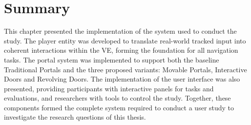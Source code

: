 \section{Summary}
\label{sec:summary}

This chapter presented the implementation of the system used to conduct the study. The player entity was developed to translate real-world tracked input
into coherent interactions within the \gls{VE}, forming the foundation for all navigation tasks. The portal system was implemented to support both the 
baseline Traditional Portals and the three proposed variants: Movable Portals, Interactive Doors and Revolving Doors. 
The implementation of the user interface was also presented, providing participants with interactive panels for tasks and evaluations, 
and researchers with tools to control the study. Together, these components formed the complete system required to conduct a user study to 
investigate the research questions of this thesis.
 


